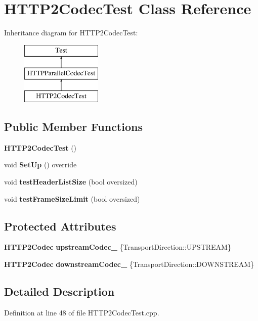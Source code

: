 \section{H\+T\+T\+P2\+Codec\+Test Class Reference}
\label{classHTTP2CodecTest}
Inheritance diagram for H\+T\+T\+P2\+Codec\+Test\+:\begin{figure}[H]
\begin{center}
\leavevmode
\includegraphics[height=3.000000cm]{classHTTP2CodecTest}
\end{center}
\end{figure}
\subsection*{Public Member Functions}
\begin{DoxyCompactItemize}
\item 
{\bf H\+T\+T\+P2\+Codec\+Test} ()
\item 
void {\bf Set\+Up} () override
\item 
void {\bf test\+Header\+List\+Size} (bool oversized)
\item 
void {\bf test\+Frame\+Size\+Limit} (bool oversized)
\end{DoxyCompactItemize}
\subsection*{Protected Attributes}
\begin{DoxyCompactItemize}
\item 
{\bf H\+T\+T\+P2\+Codec} {\bf upstream\+Codec\+\_\+} \{Transport\+Direction\+::\+U\+P\+S\+T\+R\+E\+AM\}
\item 
{\bf H\+T\+T\+P2\+Codec} {\bf downstream\+Codec\+\_\+} \{Transport\+Direction\+::\+D\+O\+W\+N\+S\+T\+R\+E\+AM\}
\end{DoxyCompactItemize}


\subsection{Detailed Description}


Definition at line 48 of file H\+T\+T\+P2\+Codec\+Test.\+cpp.



